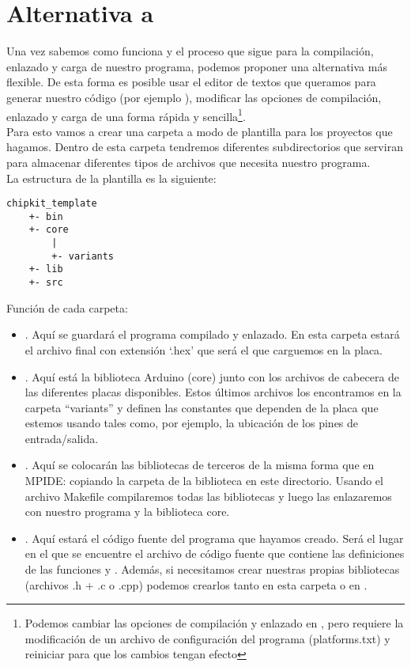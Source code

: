 \newpage

\section{Alternativa a }

Una vez sabemos como funciona  y el proceso que sigue para la compilación, enlazado y carga de nuestro programa, podemos proponer una alternativa más flexible.  
De esta forma es posible usar el editor de textos que queramos para generar nuestro código (por ejemplo ), modificar las opciones de compilación, enlazado y carga de una forma rápida y sencilla\protect\footnote{Podemos cambiar las opciones de compilación y enlazado en , pero requiere la modificación de un archivo de configuración del programa (platforms.txt) y reiniciar  para que los cambios tengan efecto}.\\
Para esto vamos a crear una carpeta a modo de plantilla para los proyectos que hagamos. Dentro de esta carpeta tendremos diferentes subdirectorios que serviran para almacenar diferentes tipos de archivos que necesita nuestro programa.\\
La estructura de la plantilla es la siguiente:
\begin{lstlisting}
chipkit_template
    +- bin
    +- core
        |
        +- variants
    +- lib
    +- src
\end{lstlisting}

Función de cada carpeta:
\begin{itemize}
    \item {}. Aquí se guardará el programa compilado y enlazado. En esta carpeta estará el archivo final con extensión `.hex' que será el que carguemos en la placa.
    \item {}. Aquí está la biblioteca Arduino (core) junto con los archivos de cabecera de las diferentes placas disponibles. Estos últimos archivos los encontramos en la carpeta ``variants'' y definen las constantes que dependen de la placa que estemos usando tales como, por ejemplo, la ubicación de los pines de entrada/salida.
    \item {}. Aquí se colocarán las bibliotecas de terceros de la misma forma que en MPIDE: copiando la carpeta de la biblioteca en este directorio. Usando el archivo Makefile compilaremos todas las bibliotecas y luego las enlazaremos con nuestro programa y la biblioteca core.
    \item {}. Aquí estará el código fuente del programa que hayamos creado. Será el lugar en el que se encuentre el archivo de código fuente  que contiene las definiciones de las funciones  y . Además, si necesitamos crear nuestras propias bibliotecas (archivos .h + .c o .cpp) podemos crearlos tanto en esta carpeta o en .
\end{itemize}

